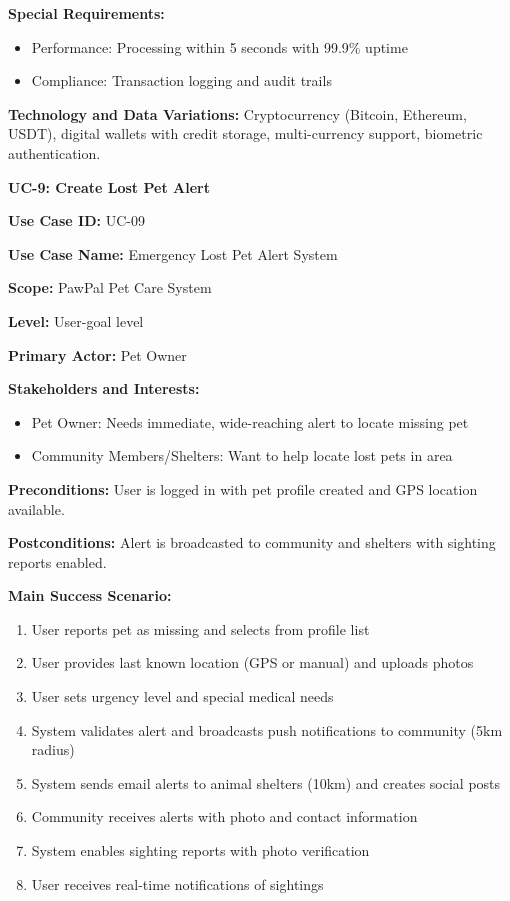 \textbf{Special Requirements:}
\begin{itemize}
    \item Performance: Processing within 5 seconds with 99.9\% uptime
    \item Compliance: Transaction logging and audit trails
\end{itemize}

\textbf{Technology and Data Variations:} Cryptocurrency (Bitcoin, Ethereum, USDT), digital wallets with credit storage, multi-currency support, biometric authentication.

\textbf{UC-9: Create Lost Pet Alert}

\textbf{Use Case ID:} UC-09

\textbf{Use Case Name:} Emergency Lost Pet Alert System

\textbf{Scope:} PawPal Pet Care System

\textbf{Level:} User-goal level

\textbf{Primary Actor:} Pet Owner

\textbf{Stakeholders and Interests:}
\begin{itemize}
    \item Pet Owner: Needs immediate, wide-reaching alert to locate missing pet
    \item Community Members/Shelters: Want to help locate lost pets in area
\end{itemize}

\textbf{Preconditions:} User is logged in with pet profile created and GPS location available.

\textbf{Postconditions:} Alert is broadcasted to community and shelters with sighting reports enabled.

\textbf{Main Success Scenario:}
\begin{enumerate}
    \item User reports pet as missing and selects from profile list
    \item User provides last known location (GPS or manual) and uploads photos
    \item User sets urgency level and special medical needs
    \item System validates alert and broadcasts push notifications to community (5km radius)
    \item System sends email alerts to animal shelters (10km) and creates social posts
    \item Community receives alerts with photo and contact information
    \item System enables sighting reports with photo verification
    \item User receives real-time notifications of sightings
\end{enumerate}

